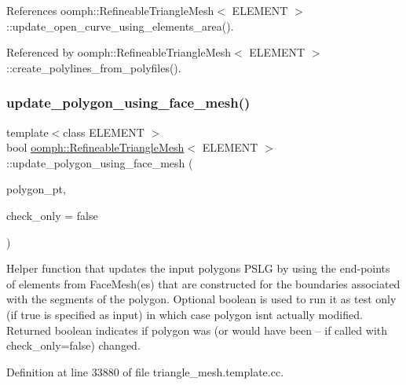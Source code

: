 References oomph\+::\+Refineable\+Triangle\+Mesh$<$ E\+L\+E\+M\+E\+N\+T $>$\+::update\+\_\+open\+\_\+curve\+\_\+using\+\_\+elements\+\_\+area().



Referenced by oomph\+::\+Refineable\+Triangle\+Mesh$<$ E\+L\+E\+M\+E\+N\+T $>$\+::create\+\_\+polylines\+\_\+from\+\_\+polyfiles().

\mbox{\label{classoomph_1_1RefineableTriangleMesh_ae089d459099bb928ced9b8a306b99df5}} 
\subsubsection{\texorpdfstring{update\+\_\+polygon\+\_\+using\+\_\+face\+\_\+mesh()}{update\_polygon\_using\_face\_mesh()}}
{\footnotesize\ttfamily template$<$class E\+L\+E\+M\+E\+NT $>$ \\
bool \hyperlink{classoomph_1_1RefineableTriangleMesh}{oomph\+::\+Refineable\+Triangle\+Mesh}$<$ E\+L\+E\+M\+E\+NT $>$\+::update\+\_\+polygon\+\_\+using\+\_\+face\+\_\+mesh (\begin{DoxyParamCaption}\item[{Triangle\+Mesh\+Polygon $\ast$}]{polygon\+\_\+pt,  }\item[{const bool \&}]{check\+\_\+only = {\ttfamily false} }\end{DoxyParamCaption})\hspace{0.3cm}{\ttfamily [protected]}}



Helper function that updates the input polygon\textquotesingle{}s P\+S\+LG by using the end-\/points of elements from Face\+Mesh(es) that are constructed for the boundaries associated with the segments of the polygon. Optional boolean is used to run it as test only (if true is specified as input) in which case polygon isn\textquotesingle{}t actually modified. Returned boolean indicates if polygon was (or would have been -- if called with check\+\_\+only=false) changed. 



Definition at line 33880 of file triangle\+\_\+mesh.\+template.\+cc.



